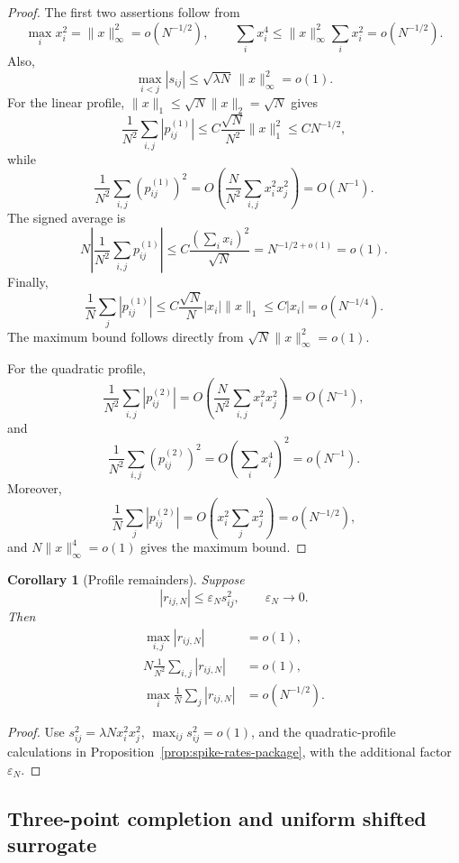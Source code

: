 \documentclass[10pt,a4paper]{amsart}
\newtheorem{corollary}[theorem]{Corollary}
\newcommand{\norm}[1]{\lVert #1\rVert}
\begin{document}
\begin{proof}
The first two assertions follow from
\[
 \max_i x_i^2=\norm{x}_\infty^2=o(N^{-1/2}),
 \qquad
 \sum_i x_i^4
 \le\norm{x}_\infty^2\sum_i x_i^2=o(N^{-1/2}).
\]
Also,
\[
 \max_{i<j}|s_{ij}|
 \le\sqrt{\lambda N}\,\norm{x}_\infty^2=o(1).
\]
For the linear profile, \(\norm{x}_1\le\sqrt N\norm{x}_2=\sqrt N\)
gives
\[
 \frac1{N^2}\sum_{i,j}|p_{ij}^{(1)}|
 \le C\frac{\sqrt N}{N^2}\norm{x}_1^2
 \le CN^{-1/2},
\]
while
\[
 \frac1{N^2}\sum_{i,j}(p_{ij}^{(1)})^2
 =O\left(\frac{N}{N^2}\sum_{i,j}x_i^2x_j^2\right)
 =O(N^{-1}).
\]
The signed average is
\[
 N\left|\frac1{N^2}\sum_{i,j}p_{ij}^{(1)}\right|
 \le C\frac{(\sum_i x_i)^2}{\sqrt N}
 =N^{-1/2+o(1)}=o(1).
\]
Finally,
\[
 \frac1N\sum_j|p_{ij}^{(1)}|
 \le C\frac{\sqrt N}{N}|x_i|\norm{x}_1
 \le C|x_i|=o(N^{-1/4}).
\]
The maximum bound follows directly from
\(\sqrt N\norm{x}_\infty^2=o(1)\).

For the quadratic profile,
\[
 \frac1{N^2}\sum_{i,j}|p_{ij}^{(2)}|
 =O\left(\frac{N}{N^2}
 \sum_{i,j}x_i^2x_j^2\right)=O(N^{-1}),
\]
and
\[
 \frac1{N^2}\sum_{i,j}(p_{ij}^{(2)})^2
 =O\left(\sum_i x_i^4\right)^2=o(N^{-1}).
\]
Moreover,
\[
 \frac1N\sum_j|p_{ij}^{(2)}|
 =O\left(x_i^2\sum_jx_j^2\right)
 =o(N^{-1/2}),
\]
and \(N\norm{x}_\infty^4=o(1)\) gives the maximum bound.
\end{proof}

\begin{corollary}[Profile remainders]
\label{cor:profile-remainder-package}
Suppose
\begin{equation}\label{eq:profile-rem-package}
 |r_{ij,N}|\le\varepsilon_Ns_{ij}^2,
 \qquad \varepsilon_N\to0.
\end{equation}
Then
\begin{align}
 \max_{i,j}|r_{ij,N}|&=o(1),\\
 N\frac1{N^2}\sum_{i,j}|r_{ij,N}|&=o(1),\\
 \max_i\frac1N\sum_j|r_{ij,N}|&=o(N^{-1/2}).
\end{align}
\end{corollary}

\begin{proof}
Use \(s_{ij}^2=\lambda N x_i^2x_j^2\),
\(\max_{ij}s_{ij}^2=o(1)\), and the quadratic-profile calculations in
Proposition~\ref{prop:spike-rates-package}, with the additional factor
\(\varepsilon_N\).
\end{proof}

\subsection{Three-point completion and uniform shifted surrogate}
\label{sec:R2-package}
\end{document}
